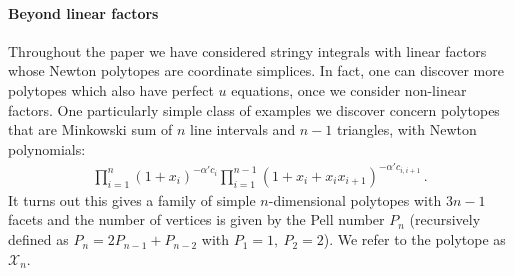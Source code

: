 \documentclass[hidelinks,12pt]{article}
\newcommand{\bea}[1]{\begin{eqnarray}\label{#1} }
\newcommand{\eea}{\end{eqnarray}}
\def\bea{\begin{eqnarray}}
\def\eea{\end{eqnarray}}
\begin{document}
\paragraph {Beyond linear factors}
Throughout the paper we have considered stringy integrals with linear factors whose Newton polytopes are coordinate simplices. In fact, one can discover more polytopes which also have perfect $u$ equations, once we consider non-linear factors. One particularly simple class of examples we discover concern polytopes that are Minkowski sum of $n$ line intervals and $n-1$ triangles, with Newton polynomials:  
\bea \label{new}
\prod_{i=1}^{n} (1+x_i )^{-\alpha' c_i}  \prod_{i=1}^{n-1} (1+x_i +x_i x_{i+1})^{-\alpha' c_{i, i+1}}\,.
\eea 
It turns out this gives a family of simple $n$-dimensional polytopes with $3n-1$ facets and the number of vertices is given by the Pell number $P_n$ (recursively defined as $ P_n=2 P_{n-1} +P_{n-2}$ with $P_1=1,~ P_2=2$). We refer to the polytope as $\mathscr{X}_n$.
\end{document}
